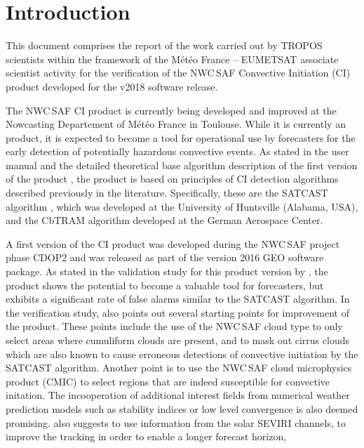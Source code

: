 \chapter{Introduction}
This document comprises the report of the work carried out by TROPOS scientists within the framework of the M\'{e}t\'{e}o France -- EUMETSAT associate scientist activity for the verification of the NWC\,SAF Convective Initiation (CI) product developed for the v2018 software release. 

The NWC\,SAF CI product is currently being developed and improved at the Nowcasting Departement of M\'{e}t\'{e}o France in Toulouse. While it is currently an  product, it is expected to become a tool for operational use by forecasters for the early detection of potentially hazardous convective events. As stated in the user manual and the detailed theoretical base algorithm description of the first version of the product \citep{Autones2016a, Autones2016b}, the product is based on principles of CI detection algorithms described previously in the literature.  Specifically, these are the SATCAST algorithm \citep{MecikalskiBedka2006, MecikalskiBedkaPaechEtAl2008, SieglaffCronceFeltzEtAl2011}, which was developed at the University of Huntsville (Alabama, USA), and the  CbTRAM algorithm \citep{ZinnerMannsteinTafferner2008, MerkZinner2013} developed at the German Aerospace Center. 

A first version of the CI product was developed during the NWC\,SAF project phase CDOP2 and was released as part of the version 2016 GEO software package. As stated in the validation study for this product version by \citet{Karagiannidis2016}, the product shows the potential to become a valuable tool for forecasters, but exhibits a significant rate of false alarms similar to the SATCAST algorithm. In the verification study, \citet{Karagiannidis2016} also points out several starting points for improvement of the product. These points include the use of the NWC\,SAF cloud type to only select areas where cumuliform clouds are present, and to mask out cirrus clouds which are also known to cause erroneous detections of convective initiation by the SATCAST algorithm. Another point is to use the NWC\,SAF cloud microphysics product (CMIC) to select regions that are indeed susceptible for convective initation. The incooperation of additional interest fields from numerical weather prediction models such as stability indices or low level convergence is also deemed promising. \citet{Karagiannidis2016} also suggests to use information from the solar SEVIRI channels, to improve the tracking in order to enable a longer forecast horizon, 

